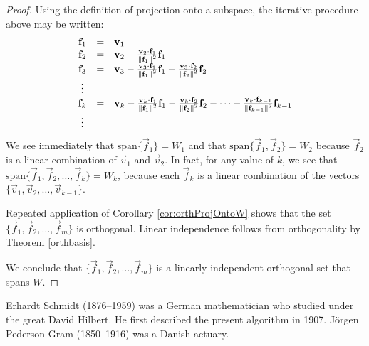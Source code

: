 \documentclass{ximera}
\begin{document}
\begin{theorem}
\begin{proof}
Using the definition of projection onto a subspace, the iterative procedure above may be written:
\begin{equation}\label{eqn:GSproof}
\begin{array}{ccl}
\mathbf{f}_{1} &=& \mathbf{v}_{1} \\
\mathbf{f}_{2} &=& \mathbf{v}_{2} - \frac{\mathbf{v}_{2} \cdot \mathbf{f}_{1}}{\left\lVert\mathbf{f}_{1}\right\rVert^2}\mathbf{f}_{1} \\
\mathbf{f}_{3} &=& \mathbf{v}_{3} - \frac{\mathbf{v}_{3} \cdot \mathbf{f}_{1}}{\left\lVert\mathbf{f}_{1}\right\rVert^2}\mathbf{f}_{1} - \frac{\mathbf{v}_{3} \cdot \mathbf{f}_{2}}{\left\lVert\mathbf{f}_{2}\right\rVert^2}\mathbf{f}_{2} \\
\vdots &&\\
\mathbf{f}_{k} &=& \mathbf{v}_{k} - \frac{\mathbf{v}_{k} \cdot \mathbf{f}_{1}}{\left\lVert\mathbf{f}_{1}\right\rVert^2}\mathbf{f}_{1} - \frac{\mathbf{v}_{k} \cdot \mathbf{f}_{2}}{\left\lVert\mathbf{f}_{2}\right\rVert^2}\mathbf{f}_{2} - \dots -\frac{\mathbf{v}_{k} \cdot \mathbf{f}_{k-1}}{\left\lVert\mathbf{f}_{k-1}\right\rVert^2}\mathbf{f}_{k-1} \\
\vdots &&
\end{array}
\end{equation}
We see immediately that $\mbox{span}\{\vec{f}_{1}\}=W_1$ and that $\mbox{span}\{\vec{f}_{1},\vec{f}_{2}\}=W_2$ because $\vec{f}_{2}$ is a linear combination of $\vec{v}_{1}$ and $\vec{v}_{2}$.  In fact, for any value of $k$, we see that $\mbox{span}\{\vec{f}_{1},\vec{f}_{2},\ldots,\vec{f}_{k}\}=W_k$, because each $\vec{f}_{k}$ is a linear combination of the vectors $\{\vec{v}_{1},\vec{v}_{2},\ldots,\vec{v}_{k-1}\}$.

Repeated application of Corollary \ref{cor:orthProjOntoW} shows that the set
 $\{\vec{f}_{1},\vec{f}_{2},\ldots,\vec{f}_{m}\}$ is orthogonal.  Linear independence follows from orthogonality by Theorem \ref{orthbasis}.  

We conclude that $\{\vec{f}_{1},\vec{f}_{2},\ldots,\vec{f}_{m}\}$ is a linearly independent orthogonal set that spans $W$.
\end{proof}
\end{theorem}

\begin{remark}\label{rem:SchmidtPederson}Erhardt
 Schmidt (1876--1959) was a German mathematician who studied under the
great David Hilbert. He
 first described the present algorithm in 1907. J\"{o}rgen Pederson Gram
(1850--1916)  was a Danish actuary.
\end{remark}
\end{document}
